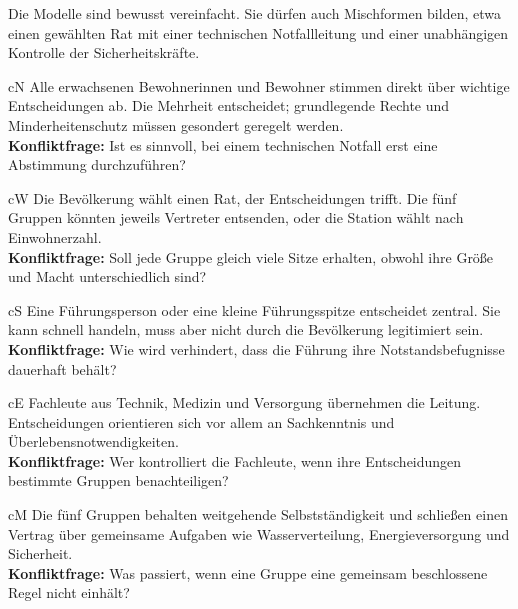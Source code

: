 \clearpage
{}
Die Modelle sind bewusst vereinfacht. Sie dürfen auch Mischformen bilden, etwa einen gewählten Rat mit einer technischen Notfallleitung und einer unabhängigen Kontrolle der Sicherheitskräfte.\par\medskip

\begin{metrobox}[title={1 \ Direkte Demokratie},fonttitle=\bfseries]{cN}
Alle erwachsenen Bewohnerinnen und Bewohner stimmen direkt über wichtige Entscheidungen ab. Die Mehrheit entscheidet; grundlegende Rechte und Minderheitenschutz müssen gesondert geregelt werden.\\
\textbf{Konfliktfrage:} Ist es sinnvoll, bei einem technischen Notfall erst eine Abstimmung durchzuführen?
\end{metrobox}\par\smallskip
\begin{metrobox}[title={2 \ Repräsentative Demokratie},fonttitle=\bfseries]{cW}
Die Bevölkerung wählt einen Rat, der Entscheidungen trifft. Die fünf Gruppen könnten jeweils Vertreter entsenden, oder die Station wählt nach Einwohnerzahl.\\
\textbf{Konfliktfrage:} Soll jede Gruppe gleich viele Sitze erhalten, obwohl ihre Größe und Macht unterschiedlich sind?
\end{metrobox}\par\smallskip
\begin{metrobox}[title={3 \ Autoritäre Führung},fonttitle=\bfseries]{cS}
Eine Führungsperson oder eine kleine Führungsspitze entscheidet zentral. Sie kann schnell handeln, muss aber nicht durch die Bevölkerung legitimiert sein.\\
\textbf{Konfliktfrage:} Wie wird verhindert, dass die Führung ihre Notstandsbefugnisse dauerhaft behält?
\end{metrobox}\par\smallskip
\begin{metrobox}[title={4 \ Technokratie},fonttitle=\bfseries]{cE}
Fachleute aus Technik, Medizin und Versorgung übernehmen die Leitung. Entscheidungen orientieren sich vor allem an Sachkenntnis und Überlebensnotwendigkeiten.\\
\textbf{Konfliktfrage:} Wer kontrolliert die Fachleute, wenn ihre Entscheidungen bestimmte Gruppen benachteiligen?
\end{metrobox}\par\smallskip
\begin{metrobox}[title={5 \ Föderation (Stationskonföderation)},fonttitle=\bfseries]{cM}
Die fünf Gruppen behalten weitgehende Selbstständigkeit und schließen einen Vertrag über gemeinsame Aufgaben wie Wasserverteilung, Energieversorgung und Sicherheit.\\
\textbf{Konfliktfrage:} Was passiert, wenn eine Gruppe eine gemeinsam beschlossene Regel nicht einhält?
\end{metrobox}

